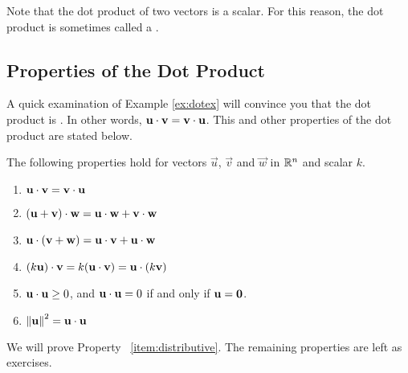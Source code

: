 \documentclass{ximera}
\begin{document}
Note that the dot product of two vectors is a scalar.  For this reason, the dot product is sometimes called a .

\subsection*{Properties of the Dot Product}

A quick examination of Example \ref{ex:dotex} will convince you that the dot product is . In other words, $\vec{u}\dotp\vec{v}=\vec{v}\dotp\vec{u}$.  This and other properties of the dot product are stated below.

\begin{theorem}\label{th:dotproductproperties} The following properties hold for
  vectors $\vec{u}$, $\vec{v}$ and $\vec{w}$ in $\RR^n$ and scalar
  $k$.
  \begin{enumerate}
  \item\label{item:commutative}
    $\vec{u}\dotp\vec{v}=\vec{v}\dotp\vec{u}$
   
  \item\label{item:distributive} $(\vec{u}+\vec{v})\dotp \vec{w}=\vec{u}\dotp \vec{w}+\vec{v}\dotp \vec{w}$
   
  \item\label{item:distributive-again} $\vec{u}\dotp (\vec{v}+\vec{w})=\vec{u}\dotp\vec{v}+\vec{u}\dotp \vec{w}$
   
  \item\label{item:scalar} $(k\vec{u})\dotp \vec{v}=k(\vec{u}\dotp\vec{v})=\vec{u}\dotp (k\vec{v})$
   
  \item \label{item:positive} $\vec{u}\dotp\vec{u}\geq 0$, and $\vec{u}\dotp\vec{u}=0$ if and only if $\vec{u}={\bf 0}$.
   
  \item \label{item:norm}
    $\norm{\vec{u}}^2=\vec{u}\dotp\vec{u}$
  \end{enumerate}
\end{theorem}

We will prove Property ~\ref{item:distributive}.  The remaining properties are left as exercises.
\end{document}
